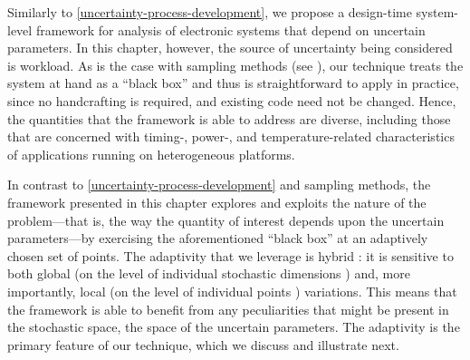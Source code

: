 Similarly to \cref{uncertainty-process-development}, we propose a design-time
system-level framework for analysis of electronic systems that depend on
uncertain parameters. In this chapter, however, the source of uncertainty being
considered is workload. As is the case with sampling methods (see ),
our technique treats the system at hand as a ``black box'' and thus is
straightforward to apply in practice, since no handcrafting is required, and
existing code need not be changed. Hence, the quantities that the framework is
able to address are diverse, including those that are concerned with timing-,
power-, and temperature-related characteristics of applications running on
heterogeneous platforms.

In contrast to \cref{uncertainty-process-development} and sampling methods, the
framework presented in this chapter explores and exploits the nature of the
problem---that is, the way the quantity of interest depends upon the uncertain
parameters---by exercising the aforementioned ``black box'' at an adaptively
chosen set of points. The adaptivity that we leverage is hybrid
\cite{jakeman2012}: it is sensitive to both global (on the level of individual
stochastic dimensions \cite{klimke2006}) and, more importantly, local (on the
level of individual points \cite{ma2009}) variations. This means that the
framework is able to benefit from any peculiarities that might be present in the
stochastic space, the space of the uncertain parameters. The adaptivity is the
primary feature of our technique, which we discuss and illustrate next.
